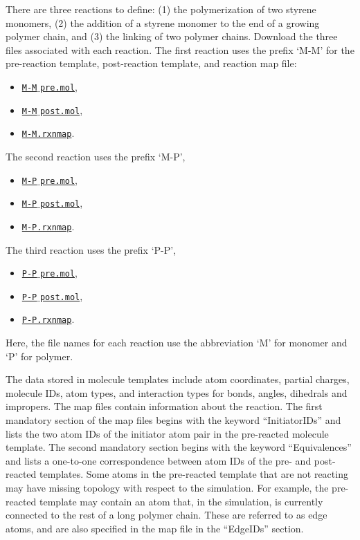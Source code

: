 \documentclass[9pt,tutorial]{livecoms}
\newcommand{\dwlcmd}[1]{\textcolor{download}{\texttt{#1}}} %
\newcommand{\filepath}{https://raw.githubusercontent.com/lammpstutorials/lammpstutorials-article/main/files/}
\begin{document}
There are three reactions to define: (1) the polymerization of two styrene monomers,
(2) the addition of a styrene monomer to the end of a growing polymer chain, and (3) the
linking of two polymer chains.  Download the three files associated with each reaction.
The first reaction uses the prefix `M-M' for the pre-reaction template,
post-reaction template, and reaction map file:
\begin{itemize}
\item \href{\filepath tutorial8/M-M_pre.mol}{\dwlcmd{M-M$\_$pre.mol}},
\item \href{\filepath tutorial8/M-M_post.mol}{\dwlcmd{M-M$\_$post.mol}},
\item \href{\filepath tutorial8/M-M.rxnmap}{\dwlcmd{M-M.rxnmap}}.
\end{itemize}
The second reaction uses the prefix `M-P',
\begin{itemize}
\item \href{\filepath tutorial8/M-P_pre.mol}{\dwlcmd{M-P$\_$pre.mol}},
\item \href{\filepath tutorial8/M-P_post.mol}{\dwlcmd{M-P$\_$post.mol}},
\item \href{\filepath tutorial8/M-P.rxnmap}{\dwlcmd{M-P.rxnmap}}.
\end{itemize}
The third reaction uses the prefix `P-P',
\begin{itemize}
\item \href{\filepath tutorial8/P-P_pre.mol}{\dwlcmd{P-P$\_$pre.mol}},
\item \href{\filepath tutorial8/P-P_post.mol}{\dwlcmd{P-P$\_$post.mol}},
\item \href{\filepath tutorial8/P-P.rxnmap}{\dwlcmd{P-P.rxnmap}}.
\end{itemize}
Here, the file names for each reaction use the abbreviation `M' for monomer and `P'
for polymer.

\begin{note}
  The data stored in molecule templates include atom coordinates,
  partial charges, molecule IDs, atom types, and interaction types for bonds,
  angles, dihedrals and impropers.  The map files contain information about
  the reaction.  The first mandatory section of the map files begins with the
  keyword “InitiatorIDs” and lists the two atom IDs of the initiator atom pair
  in the pre-reacted molecule template.  The second mandatory section begins
  with the keyword “Equivalences” and lists a one-to-one correspondence between
  atom IDs of the pre- and post-reacted templates.  Some atoms in the pre-reacted
  template that are not reacting may have missing topology with respect to the
  simulation.  For example, the pre-reacted template may contain an atom that,
  in the simulation, is currently connected to the rest of a long polymer
  chain.  These are referred to as edge atoms, and are also specified in the
  map file in the “EdgeIDs” section.
\end{note}
\end{document}
